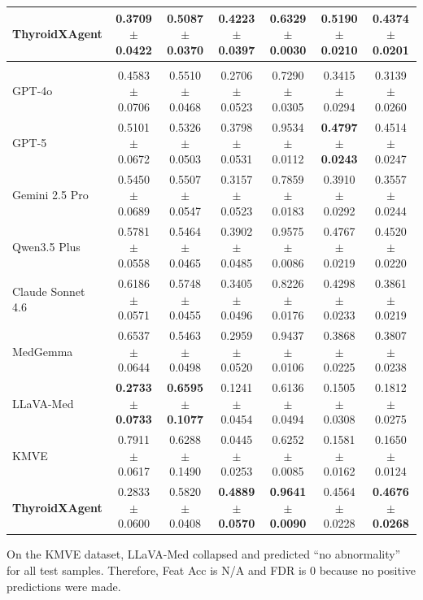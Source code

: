 \begin{table}[p]
\begin{threeparttable}
\begin{tabular}{lcccccc}
\rowcolor{lightgray}
\textbf{ThyroidXAgent}
& 0.3709$\pm$0.0422
& 0.5087$\pm$0.0370
& 0.4223$\pm$0.0397
& 0.6329$\pm$0.0030
& 0.5190$\pm$0.0210
& \textbf{0.4374$\pm$0.0201} \\

\midrule

\rowcolor{gray!20}
\multicolumn{7}{c}{\textbf{ZJH-TS Testset} ($n=150$)} \\

GPT-4o~\cite{openai_gpt4_2024}
& 0.4583$\pm$0.0706
& 0.5510$\pm$0.0468
& 0.2706$\pm$0.0523
& 0.7290$\pm$0.0305
& 0.3415$\pm$0.0294
& 0.3139$\pm$0.0260 \\

GPT-5~\cite{openai2025gpt5systemcard}
& 0.5101$\pm$0.0672
& 0.5326$\pm$0.0503
& 0.3798$\pm$0.0531
& 0.9534$\pm$0.0112
& \textbf{0.4797$\pm$0.0243}
& 0.4514$\pm$0.0247 \\

Gemini 2.5 Pro~\cite{comanici_gemini_2025}
& 0.5450$\pm$0.0689
& 0.5507$\pm$0.0547
& 0.3157$\pm$0.0523
& 0.7859$\pm$0.0183
& 0.3910$\pm$0.0292
& 0.3557$\pm$0.0244 \\

Qwen3.5 Plus~\cite{yang_qwen3_2025}
& 0.5781$\pm$0.0558
& 0.5464$\pm$0.0465
& 0.3902$\pm$0.0485
& 0.9575$\pm$0.0086
& 0.4767$\pm$0.0219
& 0.4520$\pm$0.0220 \\

Claude Sonnet 4.6
& 0.6186$\pm$0.0571
& 0.5748$\pm$0.0455
& 0.3405$\pm$0.0496
& 0.8226$\pm$0.0176
& 0.4298$\pm$0.0233
& 0.3861$\pm$0.0219 \\

MedGemma~\cite{sellergren2025medgemma}
& 0.6537$\pm$0.0644
& 0.5463$\pm$0.0498
& 0.2959$\pm$0.0520
& 0.9437$\pm$0.0106
& 0.3868$\pm$0.0225
& 0.3807$\pm$0.0238 \\

LLaVA-Med~\cite{li_llavamed_2023}
& \textbf{0.2733$\pm$0.0733}
& \textbf{0.6595$\pm$0.1077}
& 0.1241$\pm$0.0454
& 0.6136$\pm$0.0494
& 0.1505$\pm$0.0308
& 0.1812$\pm$0.0275 \\

KMVE~\cite{li_ultrasound_2024}
& 0.7911$\pm$0.0617
& 0.6288$\pm$0.1490
& 0.0445$\pm$0.0253
& 0.6252$\pm$0.0085
& 0.1581$\pm$0.0162
& 0.1650$\pm$0.0124 \\

\rowcolor{lightgray}
\textbf{ThyroidXAgent}
& 0.2833$\pm$0.0600
& 0.5820$\pm$0.0408
& \textbf{0.4889$\pm$0.0570}
& \textbf{0.9641$\pm$0.0090}
& 0.4564$\pm$0.0228
& \textbf{0.4676$\pm$0.0268} \\

\bottomrule
\end{tabular}

\begin{tablenotes}[flushleft]
\footnotesize
\item[*] On the KMVE dataset, LLaVA-Med collapsed and predicted
``no abnormality'' for all test samples. Therefore, Feat Acc is N/A
and FDR is 0 because no positive predictions were made.
\end{tablenotes}

\end{threeparttable}
\end{table}
